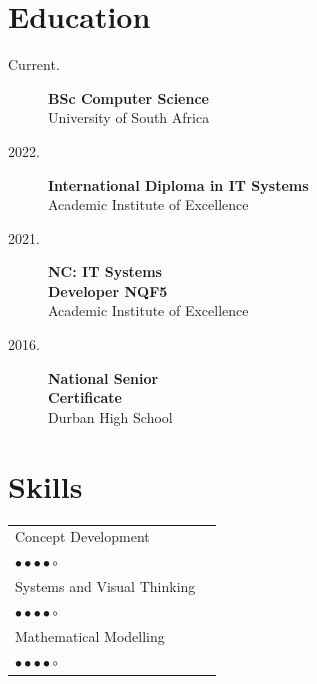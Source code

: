 \documentclass[10pt,a4paper,ragged2e,withhyper]{altacv}
\newcommand{\SkillBull}[1]{\textcolor{ColorTwo}{#1}}
\begin{document}
    
    \newpage
    \thispagestyle{empty}
    \begin{adjustbox}{valign=t}
    \begin{minipage}{0.3\textwidth}
       \section*{Education}
            \begin{description}
            	
                \item [\normalfont \textcolor{ColorOne}{Current.}] \textbf{BSc Computer Science}\\
            	University of South Africa
            	\item [\normalfont \textcolor{ColorOne}{2022.}] \textbf{International  Diploma in \newline IT Systems}\\
            	Academic Institute of Excellence 
            	\item [\normalfont \textcolor{ColorOne}{2021.}] \textbf{NC: IT Systems \\Developer NQF5}\\
            	Academic Institute of Excellence 
            	\item [\normalfont \textcolor{ColorOne}{2016.}] \textbf{National Senior \\Certificate}\\ 
            	Durban High School  
            \end{description}  
        \section*{Skills}
            \begin{tabular}{ll}
            	Concept Development \	\\ \SkillBull{$\bullet \bullet \bullet \bullet \circ$} \\
            	Systems and Visual Thinking	        \\ \SkillBull{$\bullet \bullet \bullet \bullet \circ$} \\
            	Mathematical Modelling  \\ \SkillBull{$\bullet \bullet \bullet \bullet \circ$} \\
            \end{tabular}

\end{minipage}
\end{adjustbox}
\end{document}
